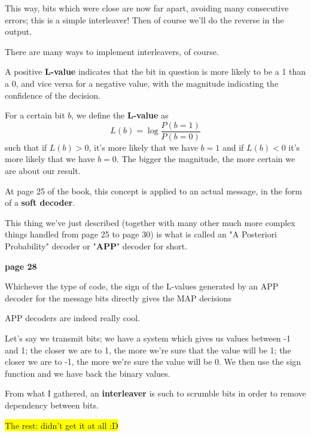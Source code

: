 \documentclass[a4paper, 11pt]{book}
\begin{document}
This way, bits which were close are now far apart, avoiding many consecutive errors; this is a simple interleaver!
Then of course we'll do the reverse in the output.

There are many ways to implement interleavers, of course.

\begin{tcolorbox}[colframe=yellow!80!black, colback=yellow!10, boxrule=1pt, arc=2pt]

    A positive \textbf{L-value} indicates that the bit in question is more likely to be a 1 than a 0, and vice versa for a negative value, with the magnitude indicating the confidence of the decision.

    For a certain bit $b$, we define the \textbf{L-value} as
    $$
    L(b) = \log \frac{P(b=1)}{P(b=0)}
    $$
    such that if $L(b) > 0$, it's more likely that we have $b=1$ and if $L(b) < 0$ it's more likely that we have $b=0$.
    The bigger the magnitude, the more certain we are about our result.
\end{tcolorbox}

At page 25 of the book, this concept is applied to an actual message, in the form of a \textbf{soft decoder}.

This thing we've just described (together with many other much more complex things handled from page 25 to page 30) is what is called an "A Posteriori Probability" decoder or "\textbf{APP}" decoder for short.

\begin{tcolorbox}[colframe=yellow!90!orange, colback=white, boxrule=1pt, arc=2pt]
    \textcolor{green!60!black}{\small \textbf{page 28}}

    \begin{tcolorbox}[frame empty, sharp corners, boxrule=0pt, leftrule=2pt, colframe=green!60!black, colback=green!5, left=5pt, top=3pt, bottom=3pt]
    Whichever the type of code, the sign of the L-values generated by an APP decoder for the message bits directly gives the MAP decisions
    \end{tcolorbox}
    
    \small APP decoders are indeed really cool.
\end{tcolorbox}

Let's say we transmit bits; we have a system which gives us values between -1 and 1; the closer we are to 1, the more we're sure that the value will be 1; the closer we are to -1, the more we're sure the value will be 0.
We then use the sign function and we have back the binary values.

\begin{tcolorbox}[frame hidden, sharp corners, boxrule=0pt, leftrule=2pt, colframe=green!60!black, colback=green!5, left=5pt, top=3pt, bottom=3pt]
From what I gathered, an \textbf{interleaver} is such to scrumble bits in order to remove dependency between bits.
\end{tcolorbox}

\colorbox{yellow}{The rest: didn't get it at all :D}
\end{document}
